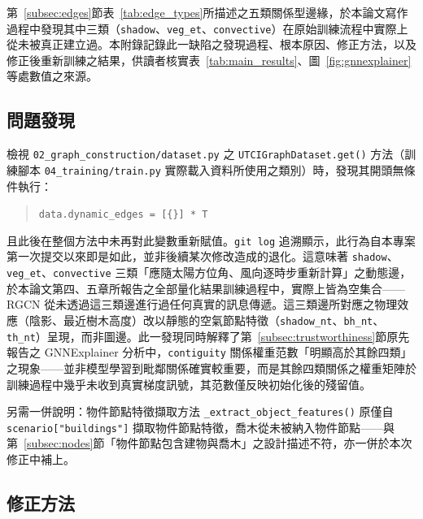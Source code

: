 第~\ref{subsec:edges}節表~\ref{tab:edge_types}所描述之五類關係型邊緣，於本論文寫作過程中發現其中三類（\texttt{shadow}、\texttt{veg\_et}、\texttt{convective}）在原始訓練流程中實際上從未被真正建立過。本附錄記錄此一缺陷之發現過程、根本原因、修正方法，以及修正後重新訓練之結果，供讀者核實表~\ref{tab:main_results}、圖~\ref{fig:gnnexplainer}等處數值之來源。

\subsection{問題發現}

檢視 \texttt{02\_graph\_construction/dataset.py} 之 \texttt{UTCIGraphDataset.get()} 方法（訓練腳本 \texttt{04\_training/train.py} 實際載入資料所使用之類別）時，發現其開頭無條件執行：

\begin{quote}
\texttt{data.dynamic\_edges = [\{\}] * T}
\end{quote}

且此後在整個方法中未再對此變數重新賦值。\texttt{git log} 追溯顯示，此行為自本專案第一次提交以來即是如此，並非後續某次修改造成的退化。這意味著 \texttt{shadow}、\texttt{veg\_et}、\texttt{convective} 三類「應隨太陽方位角、風向逐時步重新計算」之動態邊，於本論文第四、五章所報告之全部量化結果訓練過程中，實際上皆為空集合——RGCN 從未透過這三類邊進行過任何真實的訊息傳遞。這三類邊所對應之物理效應（陰影、最近樹木高度）改以靜態的空氣節點特徵（\texttt{shadow\_nt}、\texttt{bh\_nt}、\texttt{th\_nt}）呈現，而非圖邊。此一發現同時解釋了第~\ref{subsec:trustworthiness}節原先報告之 GNNExplainer 分析中，\texttt{contiguity} 關係權重范數「明顯高於其餘四類」之現象——並非模型學習到毗鄰關係確實較重要，而是其餘四類關係之權重矩陣於訓練過程中幾乎未收到真實梯度訊號，其范數僅反映初始化後的殘留值。

另需一併說明：物件節點特徵擷取方法 \texttt{\_extract\_object\_features()} 原僅自 \texttt{scenario["buildings"]} 擷取物件節點特徵，喬木從未被納入物件節點——與第~\ref{subsec:nodes}節「物件節點包含建物與喬木」之設計描述不符，亦一併於本次修正中補上。

\subsection{修正方法}


